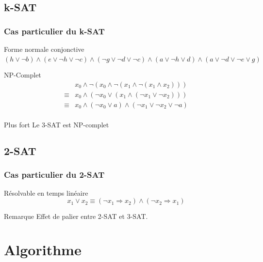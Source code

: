 \documentclass{beamer}
\begin{document}
\subsection{k-SAT}
\begin{frame}
    \frametitle{Cas particulier du k-SAT}
    \begin{exampleblock}{Forme normale conjonctive}
        $(h\vee\neg b) \wedge (e\vee\neg h\vee\neg c) \wedge (\neg g\vee\neg d\vee\neg c) \wedge (a\vee\neg h\vee d) \wedge (a\vee\neg d\vee\neg e\vee g)$
    \end{exampleblock}
    \begin{block}{NP-Complet}
        \[ \begin{array}{cl}
                & x_0 \wedge \neg(x_0 \wedge \neg(x_1 \wedge \neg (x_1 \wedge x_2))) \\
                \equiv & x_0 \wedge (\neg x_0 \vee (x_1 \wedge (\neg x_1 \vee \neg x_2))) \\
                \equiv & x_0 \wedge (\neg x_0 \vee a) \wedge (\neg x_1 \vee \neg x_2 \vee \neg a) \\
           \end{array}
        \]
    \end{block}
    \begin{alertblock}{Plus fort}
        Le 3-SAT est NP-complet
    \end{alertblock}
\end{frame}

\subsection{2-SAT}
\begin{frame}
    \frametitle{Cas particulier du 2-SAT}
    \begin{block}{Résolvable en temps linéaire}
        \[ x_1 \vee x_2 \equiv (\neg x_1 \Rightarrow x_2) \wedge (\neg x_2 \Rightarrow x_1) \]
    \end{block}
    \begin{exampleblock}{Remarque}
        Effet de palier entre 2-SAT et 3-SAT.
    \end{exampleblock}
\end{frame}

\section{Algorithme}
\end{document}
